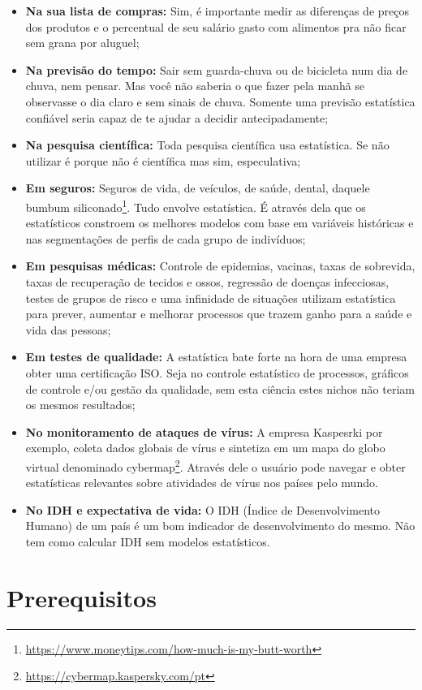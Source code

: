 \documentclass[12pt,]{style/krantz}
\renewcommand{\href}[2]{#2\footnote{\url{#1}}}
\theoremstyle{definition}
\theoremstyle{definition}
\theoremstyle{definition}
\theoremstyle{remark}
\begin{document}
\begin{itemize}
\item
  \textbf{Na sua lista de compras:} Sim, é importante medir as diferenças de preços dos produtos e o percentual de seu salário gasto com alimentos pra não ficar sem grana por aluguel;
\item
  \textbf{Na previsão do tempo:} Sair sem guarda-chuva ou de bicicleta num dia de chuva, nem pensar. Mas você não saberia o que fazer pela manhã se observasse o dia claro e sem sinais de chuva. Somente uma previsão estatística confiável seria capaz de te ajudar a decidir antecipadamente;
\item
  \textbf{Na pesquisa científica:} Toda pesquisa científica usa estatística. Se não utilizar é porque não é científica mas sim, especulativa;
\item
  \textbf{Em seguros:} Seguros de vida, de veículos, de saúde, dental, daquele \href{https://www.moneytips.com/how-much-is-my-butt-worth}{bumbum siliconado}. Tudo envolve estatística. É através dela que os estatísticos constroem os melhores modelos com base em variáveis históricas e nas segmentações de perfis de cada grupo de indivíduos;
\item
  \textbf{Em pesquisas médicas:} Controle de epidemias, vacinas, taxas de sobrevida, taxas de recuperação de tecidos e ossos, regressão de doenças infecciosas, testes de grupos de risco e uma infinidade de situações utilizam estatística para prever, aumentar e melhorar processos que trazem ganho para a saúde e vida das pessoas;
\item
  \textbf{Em testes de qualidade:} A estatística bate forte na hora de uma empresa obter uma certificação ISO. Seja no controle estatístico de processos, gráficos de controle e/ou gestão da qualidade, sem esta ciência estes nichos não teriam os mesmos resultados;
\item
  \textbf{No monitoramento de ataques de vírus:} A empresa Kaspesrki por exemplo, coleta dados globais de vírus e sintetiza em um mapa do globo virtual denominado \href{https://cybermap.kaspersky.com/pt}{cybermap}. Através dele o usuário pode navegar e obter estatísticas relevantes sobre atividades de vírus nos países pelo mundo.
\item
  \textbf{No IDH e expectativa de vida:} O IDH (Índice de Desenvolvimento Humano) de um país é um bom indicador de desenvolvimento do mesmo. Não tem como calcular IDH sem modelos estatísticos.
\end{itemize}

\hypertarget{prerequisitos}{%
\section*{Prerequisitos}\label{prerequisitos}}
\end{document}
